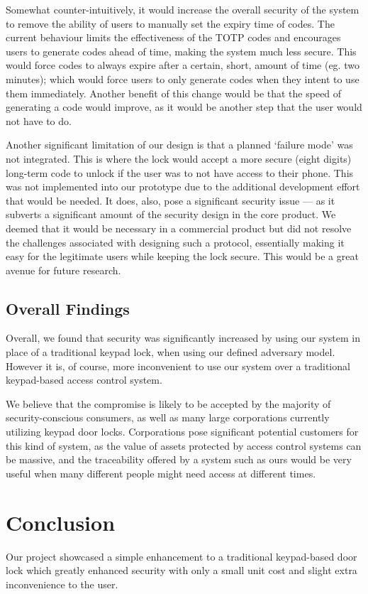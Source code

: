 \documentclass[conference]{IEEEtran}
\begin{document}
Somewhat counter-intuitively, it would increase the overall security of the system to remove the ability of users to manually set the expiry time of codes.
The current behaviour limits the effectiveness of the TOTP codes and encourages users to generate codes ahead of time, making the system much less secure.
This would force codes to always expire after a certain, short, amount of time (eg. two minutes); which would force users to only generate codes when they intent to use them immediately.
Another benefit of this change would be that the speed of generating a code would improve, as it would be another step that the user would not have to do.

Another significant limitation of our design is that a planned `failure mode' was not integrated. This is where the lock would accept a more secure (eight digits) long-term code to unlock if the user was to not have access to their phone.
This was not implemented into our prototype due to the additional development effort that would be needed.
It does, also, pose a significant security issue --- as it subverts a significant amount of the security design in the core product.
We deemed that it would be necessary in a commercial product but did not resolve the challenges associated with designing such a protocol, essentially making it easy for the legitimate users while keeping the lock secure.
This would be a great avenue for future research.

\subsection{Overall Findings}
Overall, we found that security was significantly increased by using our system in place of a traditional keypad lock, when using our defined adversary model.
However it is, of course, more inconvenient to use our system over a traditional keypad-based access control system. 

We believe that the compromise is likely to be accepted by the majority of security-conscious consumers, as well as many large corporations currently utilizing keypad door locks.
Corporations pose significant potential customers for this kind of system, as the value of assets protected by access control systems can be massive, and the traceability offered by a system such as ours would be very useful when many different people might need access at different times.



\section{Conclusion}
Our project showcased a simple enhancement to a traditional keypad-based door lock which greatly enhanced security with only a small unit cost and slight extra inconvenience to the user.
\end{document}
